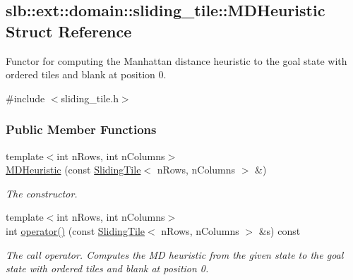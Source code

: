 \hypertarget{structslb_1_1ext_1_1domain_1_1sliding__tile_1_1MDHeuristic}{}\subsection{slb\+:\+:ext\+:\+:domain\+:\+:sliding\+\_\+tile\+:\+:M\+D\+Heuristic Struct Reference}
\label{structslb_1_1ext_1_1domain_1_1sliding__tile_1_1MDHeuristic}


Functor for computing the Manhattan distance heuristic to the goal state with ordered tiles and blank at position 0.  




{\ttfamily \#include $<$sliding\+\_\+tile.\+h$>$}

\subsubsection*{Public Member Functions}
\begin{DoxyCompactItemize}
\item 
{\footnotesize template$<$int n\+Rows, int n\+Columns$>$ }\\\hyperlink{structslb_1_1ext_1_1domain_1_1sliding__tile_1_1MDHeuristic_aca256bdbe4253562f127bb8dd03b5eb9}{M\+D\+Heuristic} (const \hyperlink{structslb_1_1ext_1_1domain_1_1sliding__tile_1_1SlidingTile}{Sliding\+Tile}$<$ n\+Rows, n\+Columns $>$ \&)\hypertarget{structslb_1_1ext_1_1domain_1_1sliding__tile_1_1MDHeuristic_aca256bdbe4253562f127bb8dd03b5eb9}{}\label{structslb_1_1ext_1_1domain_1_1sliding__tile_1_1MDHeuristic_aca256bdbe4253562f127bb8dd03b5eb9}

\begin{DoxyCompactList}\small\item\em The constructor. \end{DoxyCompactList}\item 
{\footnotesize template$<$int n\+Rows, int n\+Columns$>$ }\\int \hyperlink{structslb_1_1ext_1_1domain_1_1sliding__tile_1_1MDHeuristic_ae8ebd0e862f431a350112bc94b98f5f9}{operator()} (const \hyperlink{structslb_1_1ext_1_1domain_1_1sliding__tile_1_1SlidingTile}{Sliding\+Tile}$<$ n\+Rows, n\+Columns $>$ \&s) const 
\begin{DoxyCompactList}\small\item\em The call operator. Computes the MD heuristic from the given state to the goal state with ordered tiles and blank at position 0. \end{DoxyCompactList}\end{DoxyCompactItemize}


